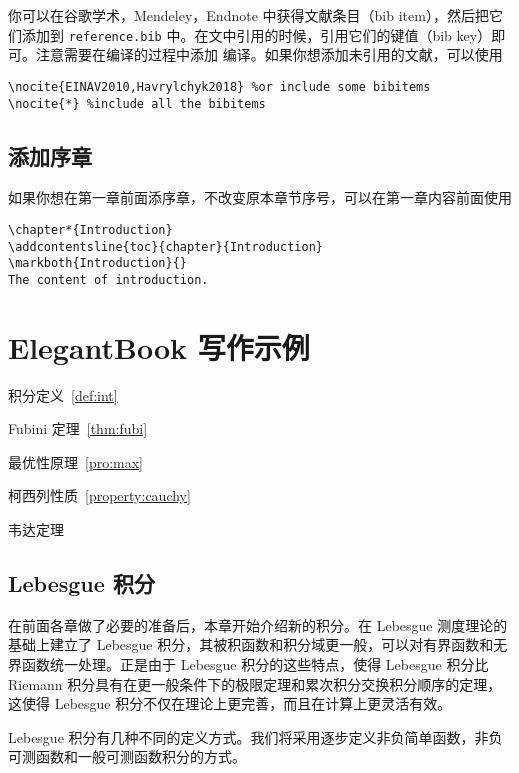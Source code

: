 \documentclass[cn,11pt,fancy,hide]{elegantbook}
\begin{document}
你可以在谷歌学术，Mendeley，Endnote 中获得文献条目（bib item），然后把它们添加到 \lstinline{reference.bib} 中。在文中引用的时候，引用它们的键值（bib key）即可。注意需要在编译的过程中添加  编译。如果你想添加未引用的文献，可以使用
\begin{lstlisting}[frame=single]
\nocite{EINAV2010,Havrylchyk2018} %or include some bibitems
\nocite{*} %include all the bibitems
\end{lstlisting}

\section{添加序章}

如果你想在第一章前面添序章，不改变原本章节序号，可以在第一章内容前面使用 
\begin{lstlisting}
\chapter*{Introduction}
\addcontentsline{toc}{chapter}{Introduction} 
\markboth{Introduction}{} 
The content of introduction.
\end{lstlisting}

\chapter{ElegantBook 写作示例}


\begin{introduction}
\item 积分定义~\ref{def:int}
\item Fubini 定理~\ref{thm:fubi}
\item 最优性原理~\ref{pro:max}
\item 柯西列性质~\ref{property:cauchy}
\item 韦达定理
\end{introduction}

\section{Lebesgue 积分}
在前面各章做了必要的准备后，本章开始介绍新的积分。在 Lebesgue 测度理论的基础上建立了 Lebesgue 积分，其被积函数和积分域更一般，可以对有界函数和无界函数统一处理。正是由于 Lebesgue 积分的这些特点，使得 Lebesgue 积分比 Riemann 积分具有在更一般条件下的极限定理和累次积分交换积分顺序的定理，这使得 Lebesgue 积分不仅在理论上更完善，而且在计算上更灵活有效。

Lebesgue 积分有几种不同的定义方式。我们将采用逐步定义非负简单函数，非负可测函数和一般可测函数积分的方式。
\end{document}
